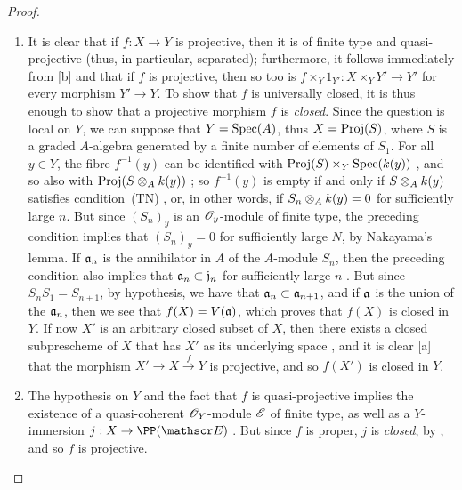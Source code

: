 \begin{proof}
\label{proof-2.5.5.3}
\medskip\noindent
\begin{enumerate}[label=\emph{(\roman*)}]
    \item It is clear that if $f:X\to Y$ is projective, then it is of finite type and quasi-projective (thus, in particular, separated);
        furthermore, it follows immediately from [b] and  that if $f$ is projective, then so too is $f\times_Y 1_{Y'}:X\times_Y Y'\to Y'$ for every morphism $Y'\to Y$.
        To show that $f$ is universally closed, it is thus enough to show that a projective morphism $f$ is \emph{closed}.
        Since the question is local on $Y$, we can suppose that $Y={\mathop{\mathrm{Spec}}\nolimits}(A)$, thus  $X={\mathop{\mathrm{Proj}}\nolimits}(S)$, where $S$ is a graded $A$-algebra generated by a finite number of elements of $S_1$.
        For all $y\in Y$, the fibre $f^{-1}(y)$ can be identified with ${\mathop{\mathrm{Proj}}\nolimits}(S)\times_Y{\mathop{\mathrm{Spec}}\nolimits}(k(y))$ , and so also with ${\mathop{\mathrm{Proj}}\nolimits}(S\otimes_Ak(y))$ ;
        so $f^{-1}(y)$ is empty if and only if $S\otimes_Ak(y)$ satisfies condition~(TN) , or, in other words, if $S_n\otimes_Ak(y)=0$ for sufficiently large $n$.
        But since $(S_n)_y$ is an $\mathscr{O}_y$-module of finite type, the preceding condition implies that $(S_n)_y=0$ for sufficiently large $N$, by Nakayama's lemma.
        If $\mathfrak{a}_n$ is the annihilator in $A$ of the $A$-module $S_n$, then the preceding condition also implies that $\mathfrak{a}_n\subset\mathfrak{j}_n$ for sufficiently large $n$ .
        But since $S_nS_1=S_{n+1}$, by hypothesis, we have that $\mathfrak{a}_n\subset\mathfrak{a}_{n+1}$, and if $\mathfrak{a}$ is the union of the $\mathfrak{a}_n$, then we see that $f(X)=V(\mathfrak{a})$, which proves that $f(X)$ is closed in $Y$.
        If now $X'$ is an arbitrary closed subset of $X$, then there exists a closed subprescheme of $X$ that has $X'$ as its underlying space , and it is clear [a] that the morphism $X'\to X\xrightarrow{f}Y$ is projective, and so $f(X')$ is closed in $Y$.
        \item The hypothesis on $Y$ and the fact that $f$ is quasi-projective implies the existence of a quasi-coherent $\mathscr{O}_Y$-module $\mathscr{E}$ of finite type, as well as a $Y$-immersion $j:X\to\PP(\sh{E})$ .
            But since $f$ is proper, $j$ is \emph{closed}, by , and so $f$ is projective.
\end{enumerate}
\end{proof}

